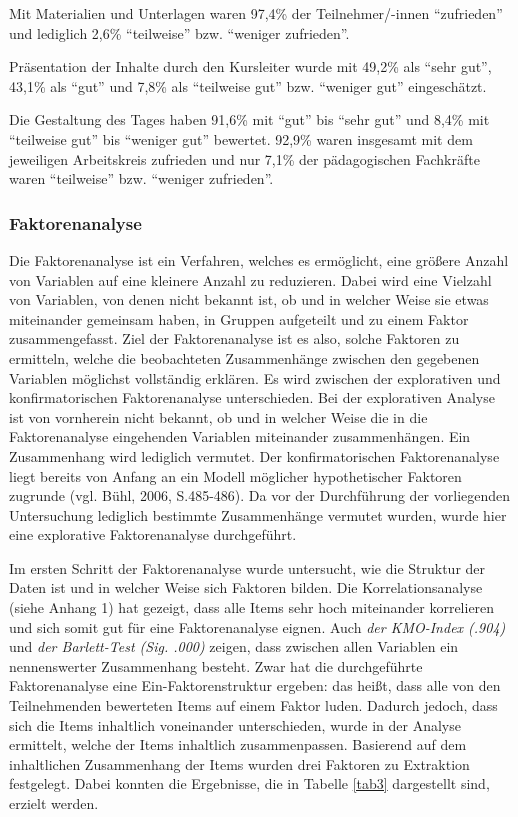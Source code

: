 \documentclass[12pt,a4paper]{article}
\begin{document}
Mit Materialien und Unterlagen waren 97,4\% der Teilnehmer/-innen "`zufrieden"' und lediglich 2,6\% "`teilweise"' bzw. "`weniger zufrieden"'. 

Präsentation der Inhalte durch den Kursleiter wurde mit 49,2\% als "`sehr gut"', 43,1\% als "`gut"' und 7,8\% als "`teilweise gut"' bzw. "`weniger gut"' eingeschätzt. 

Die Gestaltung des Tages haben 91,6\% mit "`gut"' bis "`sehr gut"' und 8,4\% mit "`teilweise gut"' bis "`weniger gut"' bewertet. 92,9\% waren insgesamt mit dem jeweiligen Arbeitskreis zufrieden und nur 7,1\% der pädagogischen Fachkräfte waren "`teilweise"' bzw. "`weniger zufrieden"'.

\subsubsection{Faktorenanalyse}

Die Faktorenanalyse ist ein Verfahren, welches es ermöglicht, eine größere Anzahl von Variablen auf eine kleinere Anzahl zu reduzieren. Dabei wird eine Vielzahl von Variablen, von denen nicht bekannt ist, ob und in welcher Weise sie etwas miteinander gemeinsam haben, in Gruppen aufgeteilt und zu einem Faktor zusammengefasst. Ziel der Faktorenanalyse ist es also, solche Faktoren zu ermitteln, welche die beobachteten Zusammenhänge zwischen den gegebenen Variablen möglichst vollständig erklären. Es wird zwischen der explorativen und konfirmatorischen Faktorenanalyse unterschieden. Bei der explorativen Analyse ist von vornherein nicht bekannt, ob und in welcher Weise die in die Faktorenanalyse eingehenden Variablen miteinander zusammenhängen. Ein Zusammenhang wird lediglich vermutet. Der konfirmatorischen Faktorenanalyse liegt bereits von Anfang an ein Modell möglicher hypothetischer Faktoren zugrunde (vgl. Bühl, 2006, S.485-486). 
Da vor der Durchführung der  vorliegenden Untersuchung lediglich bestimmte Zusammenhänge vermutet wurden, wurde hier eine explorative Faktorenanalyse durchgeführt. 

Im ersten Schritt der Faktorenanalyse wurde untersucht, wie die Struktur der Daten ist und in welcher Weise sich Faktoren bilden. Die Korrelationsanalyse (siehe Anhang 1)
hat gezeigt, dass alle Items sehr hoch miteinander korrelieren und sich somit gut für eine Faktorenanalyse eignen. Auch \textit{der KMO-Index (.904)} und \textit{der Barlett-Test (Sig. .000)} zeigen, dass zwischen allen Variablen ein nennenswerter Zusammenhang besteht. Zwar hat die durchgeführte Faktorenanalyse eine Ein-Faktorenstruktur ergeben: das heißt, dass alle von den Teilnehmenden bewerteten Items auf einem Faktor luden. Dadurch jedoch, dass sich die Items inhaltlich voneinander unterschieden, wurde in der Analyse ermittelt, welche der Items inhaltlich zusammenpassen. Basierend auf dem inhaltlichen Zusammenhang der Items wurden drei Faktoren zu Extraktion festgelegt. Dabei konnten die Ergebnisse, die in Tabelle \ref{tab3} dargestellt sind, erzielt werden.
\end{document}

